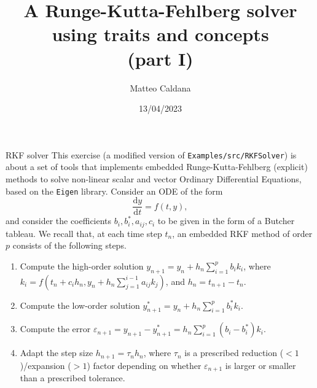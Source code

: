 \documentclass[10pt,aspectratio=169]{beamer}
\begin{document}
    \title{A Runge-Kutta-Fehlberg solver\protect\\using traits and concepts\protect\\(part I)}
    \author{Matteo Caldana}
    \date{13/04/2023}

\begin{frame}
    \maketitle
\end{frame}

\begin{frame}{RKF solver}
This exercise (a modified version of \texttt{Examples/src/RKFSolver}) is about a set of tools that implements embedded Runge-Kutta-Fehlberg (explicit) methods to solve non-linear scalar and vector Ordinary Differential Equations, based on the \texttt{Eigen} library.
\vfill
Consider an ODE of the form
\begin{equation*}
\frac{\mathrm{d} y}{\mathrm{d} t} = f(t, y),
\end{equation*}
and consider the coefficients \(b_i, b_i^*, a_{ij}, c_i\) to be given in the form of a Butcher tableau.
We recall that, at each time step \(t_n\), an embedded RKF method of order \(p\) consists of the following steps.
\begin{enumerate}
\item Compute the high-order solution \(y_{n+1} = y_{n} + h_n \sum_{i=1}^p b_i k_i\), where \(k_i = f\left(t_n + c_i h_n, y_n + h_n\sum_{j=1}^{i-1}a_{ij}k_j\right)\), and \(h_n = t_{n+1} - t_n\).
\item Compute the low-order solution \(y_{n+1}^* = y_{n} + h_n \sum_{i=1}^p b_i^* k_i\).
\item Compute the error \(\varepsilon_{n+1} = y_{n+1} - y_{n+1}^* = h_n \sum_{i=1}^p(b_i - b_i^*)k_i\).
\item Adapt the step size \(h_{n+1} = \tau_{n} h_{n}\), where \(\tau_{n}\) is a prescribed reduction (\(<1\))/expansion (\(>1\)) factor depending on whether \(\varepsilon_{n+1}\) is larger or smaller than a prescribed tolerance.
\end{enumerate}
\end{frame}
\end{document}

